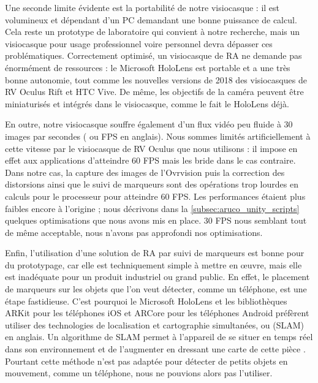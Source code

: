 Une seconde limite évidente est la portabilité de notre visiocasque  : il est volumineux et dépendant d'un PC demandant une bonne puissance de calcul. Cela reste un prototype de laboratoire qui convient à notre recherche, mais un visiocasque pour usage professionnel voire personnel devra dépasser ces problématiques. Correctement optimisé, un visiocasque de RA ne demande pas énormément de ressources : le Microsoft HoloLens est portable et a une très bonne autonomie, tout comme les nouvelles versions de 2018 des visiocasques de RV Oculus Rift et HTC Vive. De même, les objectifs de la caméra peuvent être miniaturisés et intégrés dans le visiocasque, comme le fait le HoloLens déjà.


En outre, notre visiocasque souffre également d'un flux vidéo peu fluide à 30 images par secondes ( ou FPS en anglais). Nous sommes limités artificiellement à cette vitesse par le visiocasque de RV Oculus que nous utilisons : il impose en effet aux applications d'atteindre 60 FPS mais les bride dans le cas contraire. Dans notre cas, la capture des images de l'Ovrvision puis la correction des distorsions ainsi que le suivi de marqueurs sont des opérations trop lourdes en calculs pour le processeur pour atteindre 60 FPS. Les performances étaient plus faibles encore à l'origine ; nous décrivons dans la \autoref{subsec:aruco_unity_scripts} quelques optimisations que nous avons mis en place. 30 FPS nous semblant tout de même acceptable, nous n'avons pas approfondi nos optimisations.


Enfin, l'utilisation d'une solution de RA par suivi de marqueurs est bonne pour du prototypage, car elle est techniquement simple à mettre en œuvre, mais elle est inadéquate pour un produit industriel ou grand public. En effet, le placement de marqueurs sur les objets que l'on veut détecter, comme un téléphone, est une étape fastidieuse. C'est pourquoi le Microsoft HoloLens et les bibliothèques ARKit pour les téléphones iOS et ARCore pour les téléphones Android préfèrent utiliser des technologies de localisation et cartographie simultanées, ou  (SLAM) en anglais. Un algorithme de SLAM permet à l'appareil de se situer en temps réel dans son environnement et de l'augmenter en dressant une carte de cette pièce . Pourtant cette méthode n'est pas adaptée pour détecter de petits objets en mouvement, comme un téléphone, nous ne pouvions alors pas l'utiliser.

